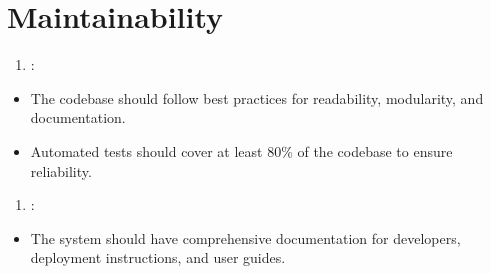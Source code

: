 \documentclass[letterpaper,10pt,english]{sphinxmanual}
\begin{document}
\section{Maintainability}
\label{\detokenize{modules/requirements:maintainability}}\begin{enumerate}
%
\setcounter{enumi}{7}
\item {} 
\sphinxAtStartPar
{}:

\end{enumerate}
\begin{itemize}
\item {} 
\sphinxAtStartPar
The codebase should follow best practices for readability, modularity, and documentation.

\item {} 
\sphinxAtStartPar
Automated tests should cover at least 80\% of the codebase to ensure reliability.

\end{itemize}
\begin{enumerate}
%
\setcounter{enumi}{8}
\item {} 
\sphinxAtStartPar
{}:

\end{enumerate}
\begin{itemize}
\item {} 
\sphinxAtStartPar
The system should have comprehensive documentation for developers, deployment instructions, and user guides.

\end{itemize}
\end{document}
